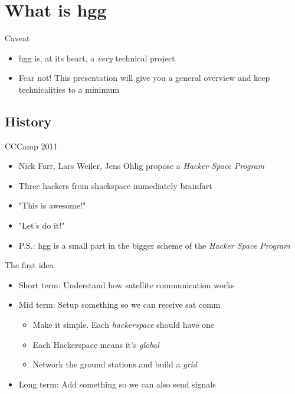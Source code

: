 
\newlength{\smallcol}
\setlength{\smallcol}{0.3\textwidth}

\newlength{\bigcol}
\setlength{\bigcol}{\textwidth}
\addtolength{\bigcol}{- \smallcol}


\begin{frame}[plain]
\end{frame}

\section{What is hgg}
	\begin{frame}{Caveat}
	\begin{itemize}
		\item hgg is, at its heart, a \emph{very} technical project
		\item Fear not!  This presentation will give you a general overview and keep technicalities to a minimum
	\end{itemize}
	\end{frame}

\subsection{History}
	\begin{frame}{CCCamp 2011}
		\begin{itemize}
			\item Nick Farr, Lars Weiler, Jens Ohlig propose a \emph{Hacker Space Program}
			\item Three hackers from shackspace immediately brainfart
			\item "This is awesome!"
			\item "Let's do it!"
			\item P.S.: hgg is a small part in the bigger scheme of the \emph{Hacker Space Program}
		\end{itemize}
	\end{frame}

	\begin{frame}{The first idea}
		\begin{itemize}
			\item Short term: Understand how satellite communication works
			\item Mid term: Setup something so we can receive sat comm
				\begin{itemize}
					\item Make it simple. Each \emph{hackerspace} should have one
					\item Each Hackerspace means it's \emph{global}
					\item Network the ground stations and build a \emph{grid}
				\end{itemize}
			\item Long term: Add something so we can also send signals
		\end{itemize}
	\end{frame}

